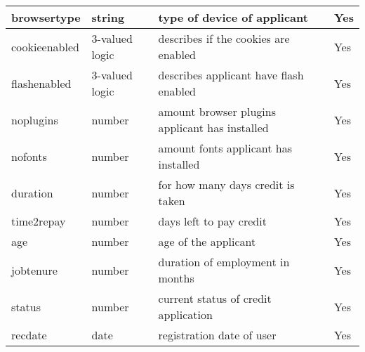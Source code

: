 \begin{table}[h!]
\begin{center}
\begin{tabular}{l|l|l|l}
          \hline
        browsertype & string & type of device of applicant & Yes\\
        \hline
        cookieenabled & 3-valued logic & describes if the cookies are enabled & Yes\\
        \hline
        flashenabled & 3-valued logic & describes applicant have flash enabled & Yes\\ %
        \hline
        noplugins & number & amount browser plugins applicant has installed & Yes\\ %
        \hline
         nofonts & number & amount fonts applicant has installed & Yes\\ %
        \hline
        duration & number & for how many days credit is taken & Yes\\ %
        \hline
        time2repay & number & days left to pay credit & Yes\\ %
        \hline
        age & number & age of the applicant & Yes\\ %
        \hline
        jobtenure & number & duration of employment in months & Yes\\ %
        \hline
        status & number & current status of credit application & Yes\\ %
        \hline
         recdate & date & registration date of user & Yes\\ %
        \hline
    \end{tabular}
  \end{center}
\end{table}



